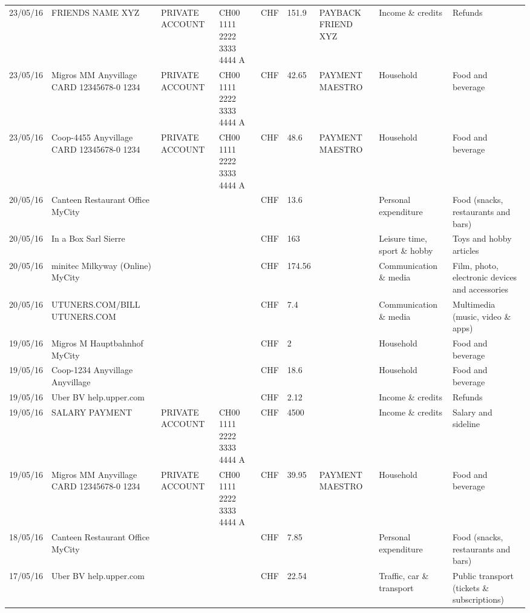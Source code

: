 \begin{landscape}
\begin{table}[t]
\begin{center}
\begin{tabular}{lllllllll}
		23/05/16 & FRIENDS NAME XYZ & PRIVATE ACCOUNT & CH00 1111 2222 3333 4444 A & CHF   & 151.9 & PAYBACK FRIEND XYZ & Income \& credits & Refunds \\
		23/05/16 & Migros MM Anyvillage CARD 12345678-0 1234 & PRIVATE ACCOUNT & CH00 1111 2222 3333 4444 A & CHF   & 42.65 & PAYMENT MAESTRO & Household & Food and beverage \\
		23/05/16 & Coop-4455 Anyvillage CARD 12345678-0 1234 & PRIVATE ACCOUNT & CH00 1111 2222 3333 4444 A & CHF   & 48.6  & PAYMENT MAESTRO & Household & Food and beverage \\
		20/05/16 & Canteen Restaurant Office      MyCity &       &       & CHF   & 13.6  &       & Personal expenditure & Food (snacks, restaurants and bars) \\
		20/05/16 & In a Box Sarl            Sierre &       &       & CHF   & 163   &       & Leisure time, sport \& hobby & Toys and hobby articles \\
		20/05/16 & minitec Milkyway (Online) MyCity &       &       & CHF   & 174.56 &       & Communication \& media & Film, photo, electronic devices and accessories \\
		20/05/16 & UTUNERS.COM/BILL          UTUNERS.COM &       &       & CHF   & 7.4   &       & Communication \& media & Multimedia (music, video \& apps) \\
		19/05/16 & Migros M Hauptbahnhof    MyCity &       &       & CHF   & 2     &       & Household & Food and beverage \\
		19/05/16 & Coop-1234 Anyvillage    Anyvillage &       &       & CHF   & 18.6  &       & Household & Food and beverage \\
		19/05/16 & Uber BV                  help.upper.com &       &       & CHF   & 2.12  &       & Income \& credits & Refunds \\
		19/05/16 & SALARY PAYMENT & PRIVATE ACCOUNT & CH00 1111 2222 3333 4444 A & CHF   & 4500  &       & Income \& credits & Salary and sideline \\
		19/05/16 & Migros MM Anyvillage CARD 12345678-0 1234 & PRIVATE ACCOUNT & CH00 1111 2222 3333 4444 A & CHF   & 39.95 & PAYMENT MAESTRO & Household & Food and beverage \\
		18/05/16 & Canteen Restaurant Office      MyCity &       &       & CHF   & 7.85  &       & Personal expenditure & Food (snacks, restaurants and bars) \\
		17/05/16 & Uber BV                  help.upper.com &       &       & CHF   & 22.54 &       & Traffic, car \& transport & Public transport (tickets \& subscriptions) \\

\end{tabular}
\end{center}
\end{table}
\end{landscape}
